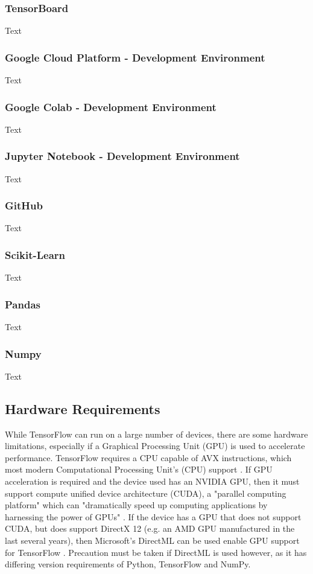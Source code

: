 \subsubsection{TensorBoard}
Text

\subsubsection{Google Cloud Platform - Development Environment}
Text

\subsubsection{Google Colab - Development Environment}
Text

\subsubsection{Jupyter Notebook - Development Environment}
Text

\subsubsection{GitHub}
Text

\subsubsection{Scikit-Learn}
Text

\subsubsection{Pandas}
Text

\subsubsection{Numpy}
Text

\subsection{Hardware Requirements}
While TensorFlow can run on a large number of devices, there are some hardware limitations, especially if a Graphical Processing Unit (GPU) is used to accelerate performance. TensorFlow requires a CPU capable of AVX instructions, which most modern Computational Processing Unit's (CPU) support \citep{InstallT17:online}. If GPU acceleration is required and the device used has an NVIDIA GPU, then it must support compute unified device architecture (CUDA), a "parallel computing platform" which can "dramatically speed up computing applications by harnessing the power of GPUs" \citep{CUDAZone2:online}. If the device has a GPU that does not support CUDA, but does support DirectX 12 (e.g. an AMD GPU manufactured in the last several years), then Microsoft's DirectML can be used enable GPU support for TensorFlow \citep{Introduc93:online}. Precaution must be taken if DirectML is used however, as it has differing version requirements of Python, TensorFlow and NumPy.

